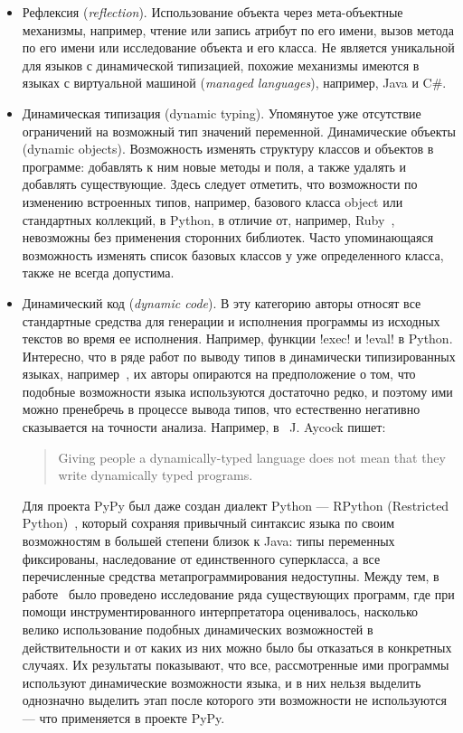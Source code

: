 \begin{itemize}
  \item{Рефлексия (\emph{reflection}). 
      Использование объекта через мета-объектные механизмы, например,
      чтение или запись атрибут по его имени, вызов метода по его имени или
      исследование объекта и его класса. Не является уникальной для языков с
      динамической типизацией, похожие механизмы имеются в языках с виртуальной
      машиной (\emph{managed languages}), например, Java и C\#.}
  \item{Динамическая типизация (dynamic typing). 
      Упомянутое уже отсутствие
      ограничений на возможный тип значений переменной.  Динамические объекты
      (dynamic objects). Возможность изменять структуру классов и объектов в
      программе: добавлять к ним новые методы и поля, а также удалять и добавлять
      существующие. Здесь следует отметить, что возможности по изменению встроенных
      типов, например, базового класса object или стандартных коллекций, в Python, в
      отличие от, например, Ruby~\cite{Madsen2007}, невозможны без применения сторонних библиотек.
      Часто упоминающаяся возможность изменять список базовых классов у уже
      определенного класса, также не всегда допустима.}
  \item{  
      Динамический код (\emph{dynamic code}).
      В эту категорию авторы относят все стандартные средства для
      генерации и исполнения программы из исходных текстов во время ее
      исполнения.  Например, функции !exec! и !eval! в Python.  Интересно, что в ряде
      работ по выводу типов в динамически типизированных языках,
      например~\cite{Salib2004,Aycock2000},  их авторы опираются на предположение о
      том, что подобные возможности языка используются достаточно редко, и поэтому
      ими можно пренебречь в процессе вывода типов, что естественно негативно
      сказывается на точности анализа. Например, в~\cite{Aycock2000} J. Aycock пишет:
      \begin{quote}
        Giving people a dynamically-typed language does not mean that they write
        dynamically typed programs.
      \end{quote}
      Для проекта PyPy был даже создан диалект Python --- RPython (Restricted
      Python)~\cite{Ancona2007}, который сохраняя привычный синтаксис языка по своим
      возможностям в большей степени близок к Java: типы переменных фиксированы,
      наследование от единственного суперкласса, а все перечисленные средства
      метапрограммирования недоступны.  Между тем, в работе~\cite{Holkner2009} было проведено
      исследование ряда существующих программ, где при помощи инструментированного
      интерпретатора оценивалось, насколько велико использование подобных
      динамических возможностей в действительности и от каких из них можно было бы
      отказаться в конкретных случаях. Их результаты показывают, что все,
      рассмотренные ими программы используют динамические возможности языка, и в них
      нельзя выделить однозначно выделить этап после которого эти возможности не
      используются --- что применяется в проекте PyPy.
    }
\end{itemize}

